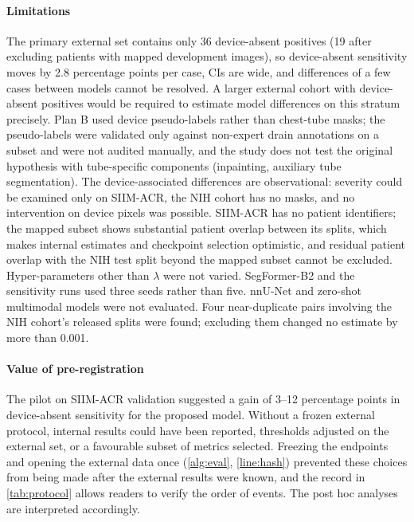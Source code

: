 \documentclass{ieeeaccess}
\begin{document}
\paragraph{Limitations}
The primary external set contains only 36 device-absent positives (19 after excluding patients with mapped development images), so device-absent sensitivity moves by 2.8 percentage points per case, CIs are wide, and differences of a few cases between models cannot be resolved. A larger external cohort with device-absent positives would be required to estimate model differences on this stratum precisely. Plan B used device pseudo-labels rather than chest-tube masks; the pseudo-labels were validated only against non-expert drain annotations on a subset and were not audited manually, and the study does not test the original hypothesis with tube-specific components (inpainting, auxiliary tube segmentation). The device-associated differences are observational: severity could be examined only on SIIM-ACR, the NIH cohort has no masks, and no intervention on device pixels was possible. SIIM-ACR has no patient identifiers; the mapped subset shows substantial patient overlap between its splits, which makes internal estimates and checkpoint selection optimistic, and residual patient overlap with the NIH test split beyond the mapped subset cannot be excluded. Hyper-parameters other than $\lambda$ were not varied. SegFormer-B2 and the sensitivity runs used three seeds rather than five. nnU-Net and zero-shot multimodal models were not evaluated. Four near-duplicate pairs involving the NIH cohort's released splits were found; excluding them changed no estimate by more than 0.001.

\paragraph{Value of pre-registration}
The pilot on SIIM-ACR validation suggested a gain of 3--12 percentage points in device-absent sensitivity for the proposed model. Without a frozen external protocol, internal results could have been reported, thresholds adjusted on the external set, or a favourable subset of metrics selected. Freezing the endpoints and opening the external data once (\cref{alg:eval}, \cref{line:hash}) prevented these choices from being made after the external results were known, and the record in \cref{tab:protocol} allows readers to verify the order of events. The post hoc analyses are interpreted accordingly.

\end{document}
